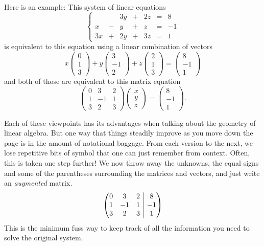 \documentclass[11pt]{amsart}
\makeatletter
\theoremstyle{definition}
\newenvironment{amatrix}[1]{%
  \left(\begin{array}{@{}*{#1}{c}|c@{}}
}{%
  \end{array}\right)
}
\makeatother
\begin{document}
Here is an example: This system of linear equations
\[
\left\{ \begin{array}{rrrrrrr}
    &   & 3y & + & 2z & = & 8 \\
  x & - &  y & + &  z & = & -1 \\
3 x & + & 2y & + & 3z & = & 1
\end{array}\right.
\]
is equivalent to this equation using a linear combination of vectors
\[
x \begin{pmatrix} 0 \\ 1 \\ 3 \end{pmatrix} +
y \begin{pmatrix} 3 \\ -1 \\ 2 \end{pmatrix} +
z \begin{pmatrix} 2 \\ 1 \\ 3 \end{pmatrix} =
\begin{pmatrix} 8 \\ -1 \\ 1 \end{pmatrix}
\]
and both of those are equivalent to this matrix equation
\[
\begin{pmatrix} 0 & 3 & 2 \\ 1 & -1 & 1 \\ 3 & 2 & 3 \end{pmatrix} \begin{pmatrix} x \\ y \\ z \end{pmatrix} = \begin{pmatrix} 8 \\ -1 \\ 1 \end{pmatrix} .
\]

Each of these viewpoints has its advantages when talking about the geometry of linear algebra.
But one way that things steadily improve as you move down the page is in the amount of notational baggage.
From each version to the next, we lose repetitive bits of symbol that one can just remember from context.
Often, this is taken one step further! We now throw away the unknowns, the equal signs and some of the parentheses surrounding the matrices and vectors, and just write an \emph{augmented} matrix.
\[
\begin{amatrix}{3}
0 & 3 & 2 & 8\\ 1 & -1 & 1 & -1\\ 3 & 2 & 3 & 1
\end{amatrix}
\]
This is the minimum fuss way to keep track of all the information you need to solve the original system.
\end{document}
